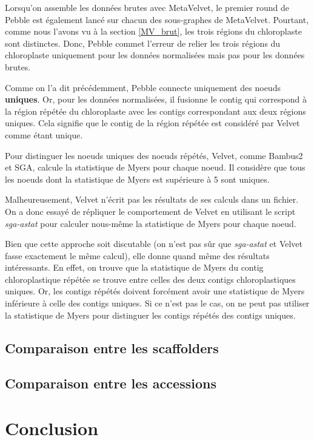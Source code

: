 \documentclass[a4paper]{article}
\begin{document}
Lorsqu'on assemble les données brutes avec MetaVelvet, le premier round de Pebble est également lancé sur chacun des sous-graphes de MetaVelvet. Pourtant, comme nous l'avons vu à la section \ref{MV_brut}, les trois régions du chloroplaste sont distinctes. Donc, Pebble commet l'erreur de relier les trois régions du chloroplaste uniquement pour les données normalisées mais pas pour les données brutes. 

Comme on l'a dit précédemment, Pebble connecte uniquement des noeuds \textbf{uniques}. Or, pour les données normalisées, il fusionne le contig qui correspond à la région répétée du chloroplaste avec les contigs correspondant aux deux régions uniques. Cela signifie que le contig de la région répétée est considéré par Velvet comme étant unique.

Pour distinguer les noeuds uniques des noeuds répétés, Velvet, comme Bambus2 et SGA, calcule la statistique de Myers pour chaque noeud. Il considère que tous les noeuds dont la statistique de Myers est supérieure à 5 sont uniques. \cite{velvetcode}

Malheureusement, Velvet n'écrit pas les résultats de ses calculs dans un fichier. On a donc essayé de répliquer le comportement de Velvet en utilisant le script \textit{sga-astat} pour calculer nous-même la statistique de Myers pour chaque noeud. 

Bien que cette approche soit discutable (on n'est pas sûr que \textit{sga-astat} et Velvet fasse exactement le même calcul), elle donne quand même des résultats intéressants. En effet, on trouve que la statistique de Myers du contig chloroplastique répétée se trouve entre celles des deux contigs chloroplastiques uniques. Or, les contigs répétés doivent forcément avoir une statistique de Myers inférieure à celle des contigs uniques. Si ce n'est pas le cas, on ne peut pas utiliser la statistique de Myers pour distinguer les contigs répétés des contigs uniques. 



\subsection{Comparaison entre les scaffolders}

\subsection{Comparaison entre les accessions}

\section{Conclusion}




\clearpage
{}

\end{document}
